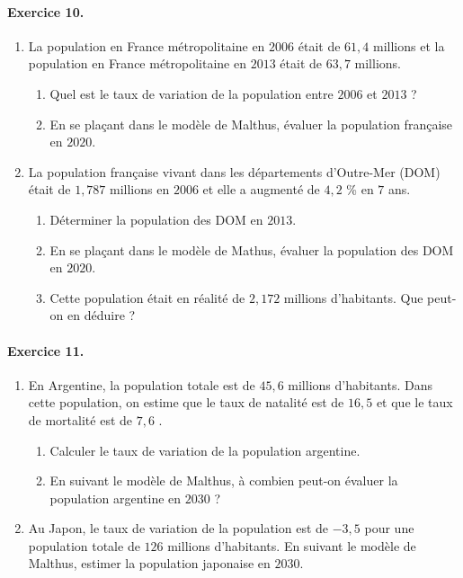 \documentclass[11pt]{article}
\begin{document}
\paragraph{Exercice 10.}

\begin{enumerate}
	\item La population en France métropolitaine en $2006$ était de $61,4$ millions et la population en France métropolitaine en $2013$ était de $63,7$ millions.
	\begin{enumerate}
		\item Quel est le taux de variation de la population entre $2006$ et $2013$ ?
		\item En se plaçant dans le modèle de Malthus, évaluer la population française en $2020$.
	\end{enumerate}
	\item La population française vivant dans les départements d’Outre-Mer (DOM) était de $1,787$ millions en $2006$ et elle a augmenté de $4,2$ \% en $7$ ans.
	\begin{enumerate}
		\item Déterminer la population des DOM en $2013$.
		\item En se plaçant dans le modèle de Mathus, évaluer la population des DOM en $2020$.
		\item Cette population était en réalité de $2,172$ millions d’habitants. Que peut-on en déduire ?
	\end{enumerate}
\end{enumerate}

\paragraph{Exercice 11.}
\begin{enumerate}
	\item En Argentine, la population totale est de $45,6$ millions d’habitants. Dans cette population, on estime que le taux de natalité est de $16,5$ \textperthousand \hspace{0.2em} et que le taux de mortalité est de $7,6$ \textperthousand.
	\begin{enumerate}
		\item Calculer le taux de variation de la population argentine.
		\item En suivant le modèle de Malthus, à combien peut-on évaluer la
          population argentine en $2030$ ?
	\end{enumerate}
	\item Au Japon, le taux de variation de la population est de $-3,5$ \textperthousand \hspace{0.2em} pour une population totale de $126$ millions d’habitants. En suivant le modèle de Malthus, estimer la population japonaise en $2030$.
\end{enumerate}
\end{document}
